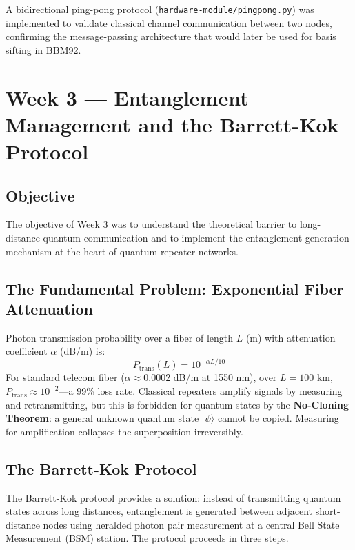 \documentclass[12pt,oneside,letterpaper,english]{article}
\begin{document}
A bidirectional ping-pong protocol (\texttt{hardware-module/pingpong.py}) was implemented to validate classical channel communication between two nodes, confirming the message-passing architecture that would later be used for basis sifting in BBM92.

\section{Week 3 --- Entanglement Management and the Barrett-Kok Protocol}

\subsection{Objective}

The objective of Week 3 was to understand the theoretical barrier to long-distance quantum communication and to implement the entanglement generation mechanism at the heart of quantum repeater networks.

\subsection{The Fundamental Problem: Exponential Fiber Attenuation}

Photon transmission probability over a fiber of length $L$ (m) with attenuation coefficient $\alpha$ (dB/m) is:
\begin{equation}
    P_{\text{trans}}(L) = 10^{-\alpha L / 10}
    \label{eq:beer_lambert}
\end{equation}
For standard telecom fiber ($\alpha \approx 0.0002$ dB/m at 1550 nm), over $L = 100$ km, $P_{\text{trans}} \approx 10^{-2}$—a 99\% loss rate. Classical repeaters amplify signals by measuring and retransmitting, but this is forbidden for quantum states by the \textbf{No-Cloning Theorem}: a general unknown quantum state $|\psi\rangle$ cannot be copied. Measuring for amplification collapses the superposition irreversibly.

\subsection{The Barrett-Kok Protocol}

The Barrett-Kok protocol provides a solution: instead of transmitting quantum states across long distances, entanglement is generated between adjacent short-distance nodes using heralded photon pair measurement at a central Bell State Measurement (BSM) station. The protocol proceeds in three steps.
\end{document}
